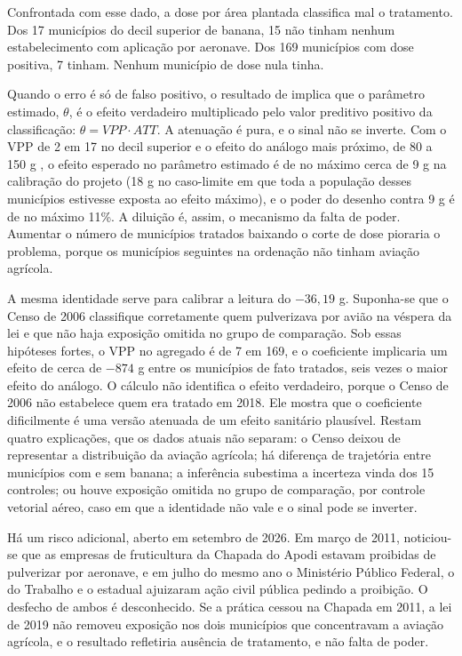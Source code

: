 Confrontada com esse dado, a dose por área plantada classifica mal o
tratamento. Dos 17 municípios do decil superior de banana, 15 não tinham
nenhum estabelecimento com aplicação por aeronave. Dos 169 municípios com dose
positiva, 7 tinham. Nenhum município de dose nula tinha.

Quando o erro é só de falso positivo, o resultado de
\citet{denteh2022misclassification} implica que o parâmetro estimado, $\theta$,
é o efeito verdadeiro multiplicado pelo valor preditivo positivo da
classificação: $\theta = VPP \cdot ATT$. A atenuação é pura, e o sinal não se
inverte. Com o VPP de 2 em 17 no decil superior e o efeito do análogo mais
próximo, de 80 a 150 g \cite{calzada2023bananas}, o efeito esperado no
parâmetro estimado é de no máximo cerca de 9 g na calibração do projeto (18 g
no caso-limite em que toda a população desses municípios estivesse exposta ao
efeito máximo), e o poder do desenho contra 9 g é de no máximo 11\%. A diluição é, assim, o mecanismo da falta de poder. Aumentar o número de
municípios tratados baixando o corte de dose pioraria o problema, porque os
municípios seguintes na ordenação não tinham aviação agrícola.

A mesma identidade serve para calibrar a leitura do $-36{,}19$ g. Suponha-se
que o Censo de 2006 classifique corretamente quem pulverizava por avião na
véspera da lei e que não haja exposição omitida no grupo de comparação. Sob
essas hipóteses fortes, o VPP no agregado é de 7 em 169, e o coeficiente
implicaria um efeito de cerca de $-874$ g entre os municípios de fato tratados,
seis vezes o maior efeito do análogo. O cálculo não identifica o efeito
verdadeiro, porque o Censo de 2006 não estabelece quem era tratado em 2018. Ele
mostra que o coeficiente dificilmente é uma versão atenuada de um efeito
sanitário plausível. Restam quatro explicações, que os dados atuais não
separam: o Censo deixou de representar a distribuição da aviação agrícola; há
diferença de trajetória entre municípios com e sem banana; a inferência
subestima a incerteza vinda dos 15 controles; ou houve exposição omitida no
grupo de comparação, por controle vetorial aéreo, caso em que a identidade não
vale e o sinal pode se inverter.

Há um risco adicional, aberto em setembro de 2026. Em março de 2011, noticiou-se
que as empresas de fruticultura da Chapada do Apodi estavam proibidas de
pulverizar por aeronave, e em julho do mesmo ano o Ministério Público Federal,
o do Trabalho e o estadual ajuizaram ação civil pública pedindo a proibição. O
desfecho de ambos é desconhecido. Se a prática cessou na Chapada em 2011, a lei
de 2019 não removeu exposição nos dois municípios que concentravam a aviação
agrícola, e o resultado refletiria ausência de tratamento, e não falta de
poder.

